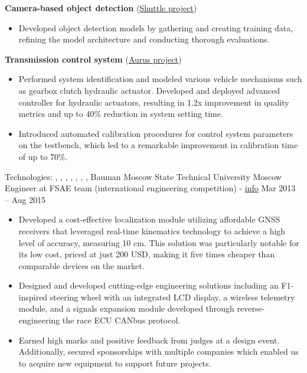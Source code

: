 \textbf{Camera-based object detection} (\href{https://www.engadget.com/2016/08/28/yandex-teams-on-self-driving-shuttle-bus/}{Shuttle project})
\begin{itemize}
    \item Developed object detection models by gathering and creating training data, refining the model architecture and conducting thorough evaluations.
\end{itemize}

\textbf{Transmission control system} (\href{https://en.wikipedia.org/wiki/Aurus_Senat}{Aurus project})
\begin{itemize}
    \item Performed system identification and modeled various vehicle mechanisms such as gearbox clutch hydraulic actuator. Developed and deployed advanced controller for hydraulic actuators, resulting in 1.2x improvement in quality metrics and up to 40\% reduction in system setting time.
    \item Introduced automated calibration procedures for control system parameters on the testbench, which led to a remarkable improvement in calibration time of up to 70\%.
\end{itemize}
Technologies: , , ,  , , , , 
\horizontalline
% 
\ressubheading
{Bauman Moscow State Technical University}
{}
{Moscow}
{Engineer at FSAE team (international engineering competition) - \href{https://baumanracing.ru/en/}{info}}
{Mar 2013 -- Aug 2015}
\begin{itemize}
    \item Developed a cost-effective localization module utilizing affordable GNSS receivers that leveraged real-time kinematics technology to achieve a high level of accuracy, measuring 10 cm. This solution was particularly notable for its low cost, priced at just 200 USD, making it five times cheaper than comparable devices on the market.
    \item Designed and developed cutting-edge engineering solutions including an F1-inspired steering wheel with an integrated LCD display, a wireless telemetry module, and a signals expansion module developed through reverse-engineering the race ECU CANbus protocol.
    \item Earned high marks and positive feedback from judges at a design event. Additionally, secured sponsorships with multiple companies which enabled us to acquire new equipment to support future projects.
\end{itemize}
